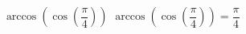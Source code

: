  {$\arccos\left(\cos\left(\dfrac{\pi}{4}\right) \right)$ }
{ $\arccos\left(\cos\left(\dfrac{\pi}{4}\right) \right) = \dfrac{\pi}{4}$ }
